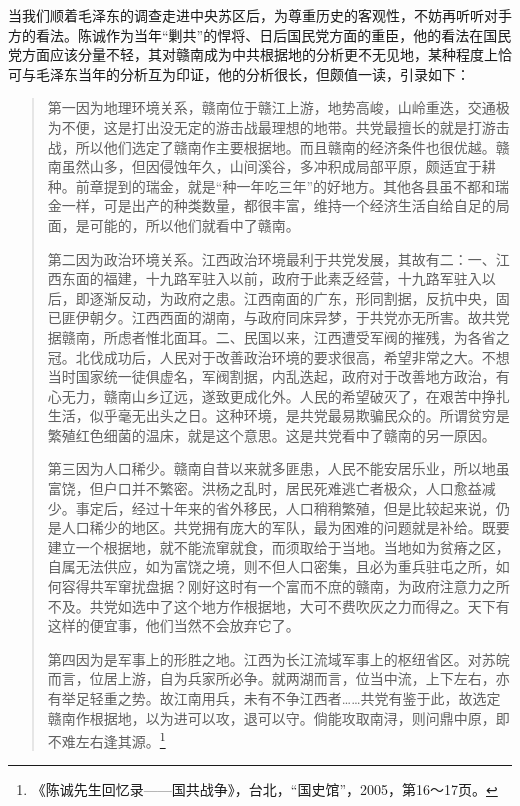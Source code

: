 当我们顺着毛泽东的调查走进中央苏区后，为尊重历史的客观性，不妨再听听对手方的看法。陈诚作为当年“剿共”的悍将、日后国民党方面的重臣，他的看法在国民党方面应该分量不轻，其对赣南成为中共根据地的分析更不无见地，某种程度上恰可与毛泽东当年的分析互为印证，他的分析很长，但颇值一读，引录如下：

\begin{quote}

第一因为地理环境关系，赣南位于赣江上游，地势高峻，山岭重迭，交通极为不便，这是打出没无定的游击战最理想的地带。共党最擅长的就是打游击战，所以他们选定了赣南作主要根据地。而且赣南的经济条件也很优越。赣南虽然山多，但因侵蚀年久，山间溪谷，多冲积成局部平原，颇适宜于耕种。前章提到的瑞金，就是“种一年吃三年”的好地方。其他各县虽不都和瑞金一样，可是出产的种类数量，都很丰富，维持一个经济生活自给自足的局面，是可能的，所以他们就看中了赣南。

第二因为政治环境关系。江西政治环境最利于共党发展，其故有二：一、江西东面的福建，十九路军驻入以前，政府于此素乏经营，十九路军驻入以后，即逐渐反动，为政府之患。江西南面的广东，形同割据，反抗中央，固已匪伊朝夕。江西西面的湖南，与政府同床异梦，于共党亦无所害。故共党据赣南，所虑者惟北面耳。二、民国以来，江西遭受军阀的摧残，为各省之冠。北伐成功后，人民对于改善政治环境的要求很高，希望非常之大。不想当时国家统一徒俱虚名，军阀割据，内乱迭起，政府对于改善地方政治，有心无力，赣南山乡辽远，遂致更成化外。人民的希望破灭了，在艰苦中挣扎生活，似乎毫无出头之日。这种环境，是共党最易欺骗民众的。所谓贫穷是繁殖红色细菌的温床，就是这个意思。这是共党看中了赣南的另一原因。

第三因为人口稀少。赣南自昔以来就多匪患，人民不能安居乐业，所以地虽富饶，但户口并不繁密。洪杨之乱时，居民死难逃亡者极众，人口愈益减少。事定后，经过十年来的省外移民，人口稍稍繁殖，但是比较起来说，仍是人口稀少的地区。共党拥有庞大的军队，最为困难的问题就是补给。既要建立一个根据地，就不能流窜就食，而须取给于当地。当地如为贫瘠之区，自属无法供应，如为富饶之境，则不但人口密集，且必为重兵驻屯之所，如何容得共军窜扰盘据？刚好这时有一个富而不庶的赣南，为政府注意力之所不及。共党如选中了这个地方作根据地，大可不费吹灰之力而得之。天下有这样的便宜事，他们当然不会放弃它了。

第四因为是军事上的形胜之地。江西为长江流域军事上的枢纽省区。对苏皖而言，位居上游，自为兵家所必争。就两湖而言，位当中流，上下左右，亦有举足轻重之势。故江南用兵，未有不争江西者……共党有鉴于此，故选定赣南作根据地，以为进可以攻，退可以守。倘能攻取南浔，则问鼎中原，即不难左右逢其源。\footnote{《陈诚先生回忆录——国共战争》，台北，“国史馆”，2005，第16～17页。}
\end{quote}



